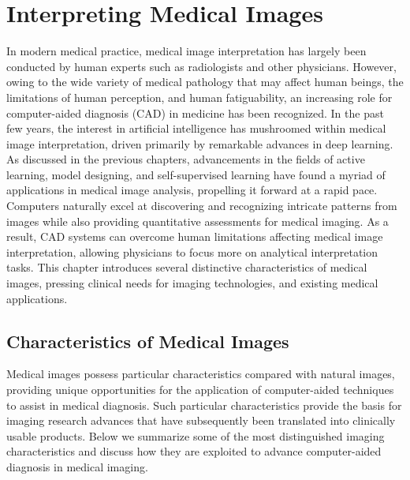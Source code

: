 \chapter{Interpreting Medical Images}
\label{ch6}

In modern medical practice, medical image interpretation has largely been conducted by human experts such as radiologists and other physicians. However, owing to the wide variety of medical pathology that may affect human beings, the limitations of human perception, and human fatiguability, an increasing role for computer-aided diagnosis (CAD) in medicine has been recognized. In the past few years, the interest in artificial intelligence has mushroomed within medical image interpretation, driven primarily by remarkable advances in deep learning. As discussed in the previous chapters, advancements in the fields of active learning, model designing, and self-supervised learning have found a myriad of applications in medical image analysis, propelling it forward at a rapid pace. Computers naturally excel at discovering and recognizing intricate patterns from images while also providing quantitative assessments for medical imaging. As a result, CAD systems can overcome human limitations affecting medical image interpretation, allowing physicians to focus more on analytical interpretation tasks. This chapter introduces several distinctive characteristics of medical images, pressing clinical needs for imaging technologies, and existing medical applications.

\section{Characteristics of Medical Images}
\label{ch6:characteristics}

Medical images possess particular characteristics compared with natural images, providing unique opportunities for the application of computer-aided techniques to assist in medical diagnosis. Such particular characteristics provide the basis for imaging research advances that have subsequently been translated into clinically usable products. Below we summarize some of the most distinguished imaging characteristics and discuss how they are exploited to advance computer-aided diagnosis in medical imaging.

